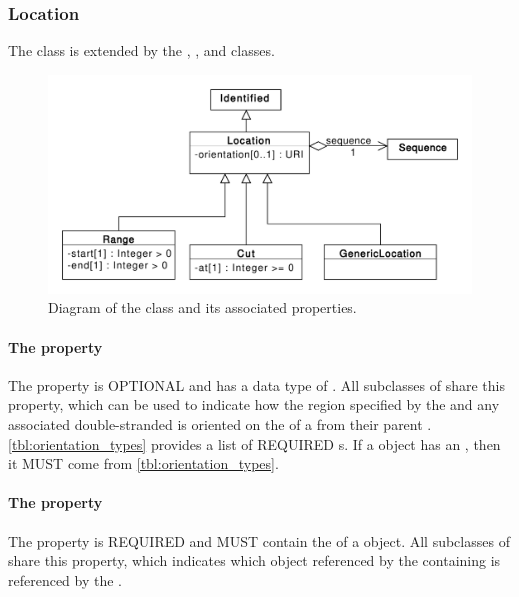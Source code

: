 \subsubsection{Location}
\label{sec:Location}
The  class is extended by the , , and  classes.

\begin{figure}[ht]
\begin{center}
\includegraphics[scale=0.6]{uml/location}
\caption[]{Diagram of the  class and its associated properties.}
\label{uml:location}
\end{center}
\end{figure} 

\paragraph{The  property}
\label{sec:orientation}
The  property is OPTIONAL and has a data type of . All subclasses of  share this property, which can be used to indicate how the region specified by the  and any associated double-stranded  is oriented on the  of a   from their parent . \ref{tbl:orientation_types} provides a list of REQUIRED  s. If a  object has an , then it MUST come from \ref{tbl:orientation_types}.

\paragraph{The  property}
\label{sec:sequence}
The  property is REQUIRED and MUST contain the  of a  object. All subclasses of  share this property, which indicates which  object referenced by the containing  is referenced by the .

